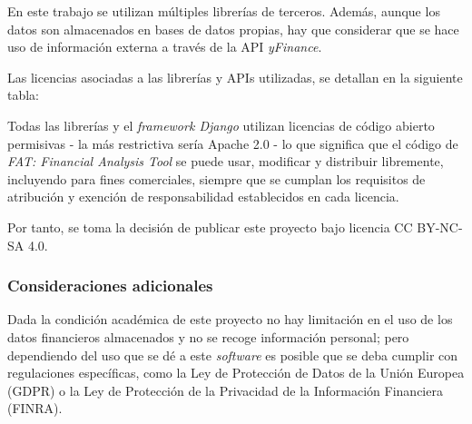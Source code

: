 En este trabajo se utilizan múltiples librerías de terceros. Además, aunque los datos son almacenados en bases de datos propias, hay que considerar que se hace uso de información externa a través de la API \emph{yFinance}. 

Las licencias asociadas a las librerías y APIs utilizadas, se detallan en la siguiente tabla:


Todas las librerías y el \emph{framework Django} utilizan licencias de código abierto permisivas - la más restrictiva sería Apache 2.0 - lo que significa que el código de \emph{FAT: Financial Analysis Tool} se puede usar, modificar y distribuir libremente, incluyendo para fines comerciales, siempre que se cumplan los requisitos de atribución y exención de responsabilidad establecidos en cada licencia.

Por tanto, se toma la decisión de publicar este proyecto bajo licencia CC BY-NC-SA 4.0\citep{online:licencia}.

\subsubsection{Consideraciones adicionales}

Dada la condición académica de este proyecto no hay limitación en el uso de los datos financieros almacenados y no se recoge información personal; pero dependiendo del uso que se dé a este \emph{software} es posible que se deba cumplir con regulaciones específicas, como la Ley de Protección de Datos de la Unión Europea (GDPR) o la Ley de Protección de la Privacidad de la Información Financiera (FINRA). 












